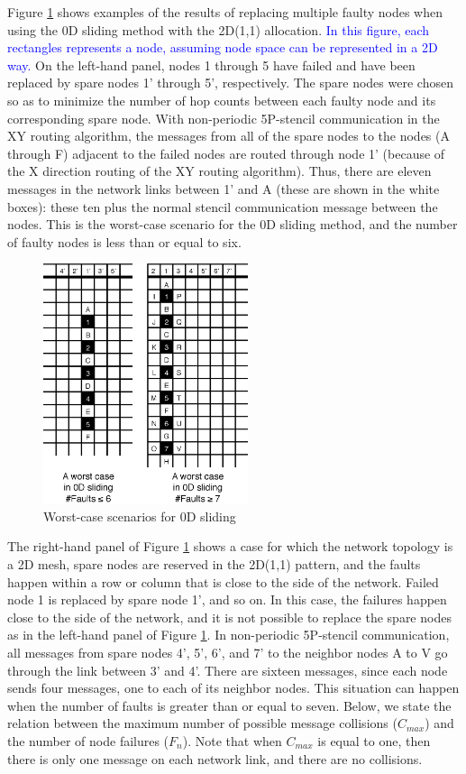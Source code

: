 \documentclass[Afour,times,sagev]{sagej}
\newcommand{\AH}[1]{%
  \textcolor{blue}{#1}}%
\begin{document}
Figure \ref{fig:0d-worst-cases} shows examples of the results of
replacing multiple faulty nodes when using the 0D sliding method with
the 2D(1,1) allocation. \AH{In this figure, each rectangles represents a
node, assuming node space can be represented in a 2D way.} On the
left-hand panel, nodes 1 through 5 have failed and have been replaced
by spare nodes 1' through 5', respectively. The spare nodes were
chosen so as to minimize the number of hop counts between each faulty
node and its corresponding spare node. With non-periodic 5P-stencil
communication in the XY routing algorithm, the messages from all of
the spare nodes to the nodes (A through F) adjacent to the failed
nodes are routed through node 1' (because of the X direction routing
of the XY routing algorithm). Thus, there are eleven messages in the
network links between 1' and A  (these are shown in the white boxes):
these ten plus the normal stencil communication message between the
nodes. This is the worst-case scenario for the 0D sliding method, and
the number of faulty nodes is less than or equal to six.

\begin{figure}[ht]
\centering
\includegraphics[width=60mm]{Figs/0D-WorstCases.eps}
  \caption{Worst-case scenarios for 0D sliding}
  \label{fig:0d-worst-cases}
\end{figure}

The right-hand panel of Figure \ref{fig:0d-worst-cases} shows a case
for which the network topology is a 2D mesh, spare nodes are reserved
in the 2D(1,1) pattern, and the faults happen within a row or column
that is close to the side of the network. Failed node 1 is replaced by
spare node 1', and so on. In this case, the failures happen close to
the side of the network, and it is not possible to replace the spare
nodes as in the left-hand panel of Figure \ref{fig:0d-worst-cases}. In
non-periodic 5P-stencil communication, all messages from spare nodes
4', 5', 6', and 7' to the neighbor nodes A to V go through the link
between 3' and 4'. There are sixteen messages, since each node sends
four messages, one to each of its neighbor nodes. This situation can
happen when the number of faults is greater than or equal to
seven. Below, we state the relation between the maximum number of
possible message collisions ($C_{max}$) and the number of node
failures ($F_n$). Note that when $C_{max}$ is equal to one, then there
is only one message on each network link, and there are no collisions.
\end{document}

